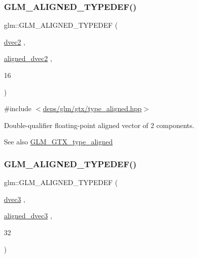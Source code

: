 \subsubsection{\texorpdfstring{G\+L\+M\+\_\+\+A\+L\+I\+G\+N\+E\+D\+\_\+\+T\+Y\+P\+E\+D\+E\+F()}{GLM\_ALIGNED\_TYPEDEF()}\hspace{0.1cm}{\footnotesize\ttfamily [156/209]}}
{\footnotesize\ttfamily glm\+::\+G\+L\+M\+\_\+\+A\+L\+I\+G\+N\+E\+D\+\_\+\+T\+Y\+P\+E\+D\+EF (\begin{DoxyParamCaption}\item[{\hyperlink{group__core__types_gae6727259898288cae197724d5f172b3b}{dvec2}}]{,  }\item[{\hyperlink{group__gtc__type__aligned_ga1e6972e837bc34b3424af8d63a71d7c6}{aligned\+\_\+dvec2}}]{,  }\item[{16}]{ }\end{DoxyParamCaption})}



{\ttfamily \#include $<$\hyperlink{gtx_2type__aligned_8hpp}{deps/glm/gtx/type\+\_\+aligned.\+hpp}$>$}

Double-\/qualifier floating-\/point aligned vector of 2 components. \begin{DoxySeeAlso}{See also}
\hyperlink{group__gtx__type__aligned}{G\+L\+M\+\_\+\+G\+T\+X\+\_\+type\+\_\+aligned} 
\end{DoxySeeAlso}
\mbox{\label{group__gtx__type__aligned_ga01fe6fee6db5df580b6724a7e681f069}} 
\subsubsection{\texorpdfstring{G\+L\+M\+\_\+\+A\+L\+I\+G\+N\+E\+D\+\_\+\+T\+Y\+P\+E\+D\+E\+F()}{GLM\_ALIGNED\_TYPEDEF()}\hspace{0.1cm}{\footnotesize\ttfamily [157/209]}}
{\footnotesize\ttfamily glm\+::\+G\+L\+M\+\_\+\+A\+L\+I\+G\+N\+E\+D\+\_\+\+T\+Y\+P\+E\+D\+EF (\begin{DoxyParamCaption}\item[{\hyperlink{group__core__types_ga7f3287f952e6ccb481231368091702ac}{dvec3}}]{,  }\item[{\hyperlink{group__gtc__type__aligned_ga82da11893fbac3bda647c9de9da62693}{aligned\+\_\+dvec3}}]{,  }\item[{32}]{ }\end{DoxyParamCaption})}



